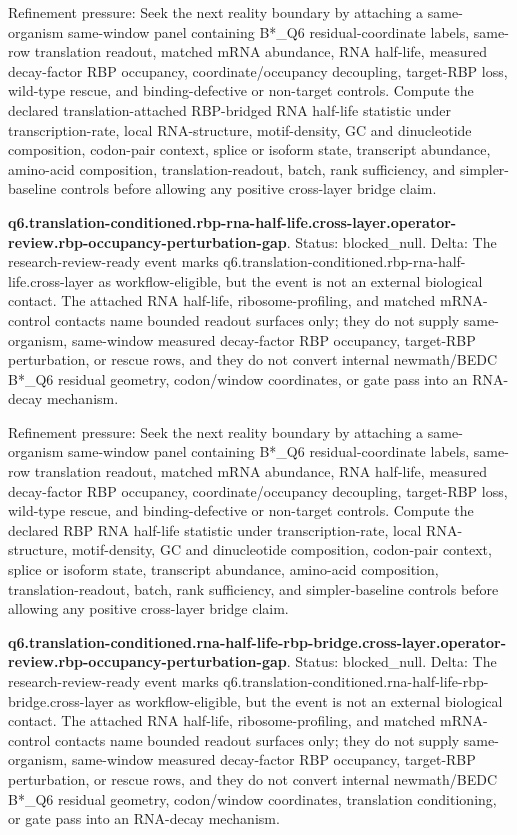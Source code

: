 Refinement pressure: Seek the next reality boundary by attaching a same-organism same-window panel containing B*\_Q6 residual-coordinate labels, same-row translation readout, matched mRNA abundance, RNA half-life, measured decay-factor RBP occupancy, coordinate/occupancy decoupling, target-RBP loss, wild-type rescue, and binding-defective or non-target controls. Compute the declared translation-attached RBP-bridged RNA half-life statistic under transcription-rate, local RNA-structure, motif-density, GC and dinucleotide composition, codon-pair context, splice or isoform state, transcript abundance, amino-acid composition, translation-readout, batch, rank sufficiency, and simpler-baseline controls before allowing any positive cross-layer bridge claim.

\textbf{q6.translation-conditioned.rbp-rna-half-life.cross-layer.operator-review.rbp-occupancy-perturbation-gap}. Status: blocked\_null. Delta: The research-review-ready event marks q6.translation-conditioned.rbp-rna-half-life.cross-layer as workflow-eligible, but the event is not an external biological contact. The attached RNA half-life, ribosome-profiling, and matched mRNA-control contacts name bounded readout surfaces only; they do not supply same-organism, same-window measured decay-factor RBP occupancy, target-RBP perturbation, or rescue rows, and they do not convert internal newmath/BEDC B*\_Q6 residual geometry, codon/window coordinates, or gate pass into an RNA-decay mechanism.

Refinement pressure: Seek the next reality boundary by attaching a same-organism same-window panel containing B*\_Q6 residual-coordinate labels, same-row translation readout, matched mRNA abundance, RNA half-life, measured decay-factor RBP occupancy, coordinate/occupancy decoupling, target-RBP loss, wild-type rescue, and binding-defective or non-target controls. Compute the declared RBP RNA half-life statistic under transcription-rate, local RNA-structure, motif-density, GC and dinucleotide composition, codon-pair context, splice or isoform state, transcript abundance, amino-acid composition, translation-readout, batch, rank sufficiency, and simpler-baseline controls before allowing any positive cross-layer bridge claim.

\textbf{q6.translation-conditioned.rna-half-life-rbp-bridge.cross-layer.operator-review.rbp-occupancy-perturbation-gap}. Status: blocked\_null. Delta: The research-review-ready event marks q6.translation-conditioned.rna-half-life-rbp-bridge.cross-layer as workflow-eligible, but the event is not an external biological contact. The attached RNA half-life, ribosome-profiling, and matched mRNA-control contacts name bounded readout surfaces only; they do not supply same-organism, same-window measured decay-factor RBP occupancy, target-RBP perturbation, or rescue rows, and they do not convert internal newmath/BEDC B*\_Q6 residual geometry, codon/window coordinates, translation conditioning, or gate pass into an RNA-decay mechanism.

